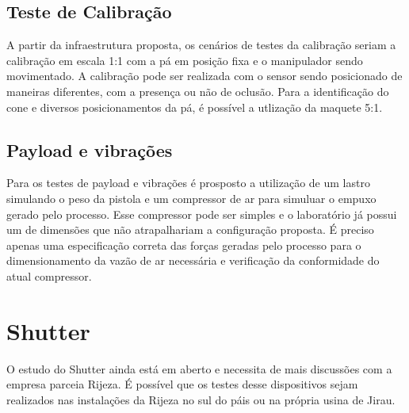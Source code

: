 \subsection{Teste de Calibração}

A partir da infraestrutura proposta, os cenários de testes da calibração seriam
a calibração em escala 1:1 com a pá em posição fixa e o manipulador sendo
movimentado. A calibração pode ser realizada com o sensor sendo posicionado de
maneiras diferentes, com a presença ou não de oclusão. Para a identificação do
cone e diversos posicionamentos da pá, é possível a utlização da maquete 5:1.

\subsection{Payload e vibrações}

Para os testes de payload e vibrações é prosposto a utilização de um lastro
simulando o peso da pistola e um compressor de ar para simuluar o empuxo gerado
pelo processo. Esse compressor pode ser simples e o laboratório já possui um de
dimensões que não atrapalhariam a configuração proposta. É preciso apenas uma
especificação correta das forças geradas pelo processo para o dimensionamento da
vazão de ar necessária e verificação da conformidade do atual compressor.

\section{Shutter}

O estudo do Shutter ainda está em aberto e necessita de mais discussões com a
empresa parceia Rijeza. É possível que os testes desse dispositivos sejam
realizados nas instalações da Rijeza no sul do páis ou na própria usina de
Jirau.
